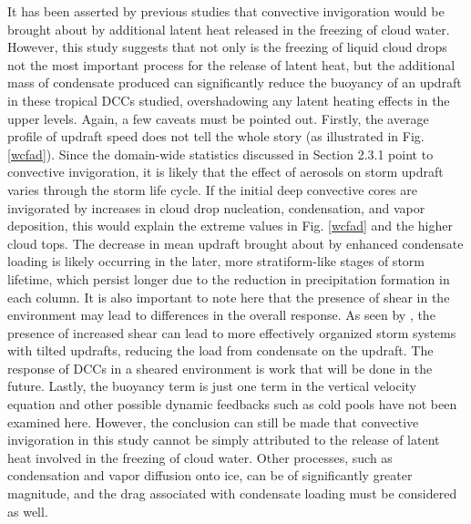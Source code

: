 It has been asserted by previous studies that convective invigoration would be brought about by additional latent heat released in the freezing of cloud water.  However, this study suggests that not only is the freezing of liquid cloud drops not the most important process for the release of latent heat, but the additional mass of condensate produced can significantly reduce the buoyancy of an updraft in these tropical DCCs studied, overshadowing any latent heating effects in the upper levels.  Again, a few caveats must be pointed out.  Firstly, the average profile of updraft speed does not tell the whole story (as illustrated in Fig. \ref{wcfad}).  Since the domain-wide statistics discussed in Section 2.3.1 point to convective invigoration, it is likely that the effect of aerosols on storm updraft varies through the storm life cycle.  If the initial deep convective cores are invigorated by increases in cloud drop nucleation, condensation, and vapor deposition, this would explain the extreme values in Fig. \ref{wcfad} and the higher cloud tops.  The decrease in mean updraft brought about by enhanced condensate loading is likely occurring in the later, more stratiform-like stages of storm lifetime, which persist longer due to the reduction in precipitation formation in each column.  It is also important to note here that the presence of shear in the environment may lead to differences in the overall response.  As seen by \citet{nichollsshear}, the presence of increased shear can lead to more effectively organized storm systems with tilted updrafts, reducing the load from condensate on the updraft.  The response of DCCs in a sheared environment is work that will be done in the future.  Lastly, the buoyancy term is just one term in the vertical velocity equation and other possible dynamic feedbacks such as cold pools have not been examined here.  However, the conclusion can still be made that convective invigoration in this study cannot be simply attributed to the release of latent heat involved in the freezing of cloud water.  Other processes, such as condensation and vapor diffusion onto ice, can be of significantly greater magnitude, and the drag associated with condensate loading must be considered as well.



 



